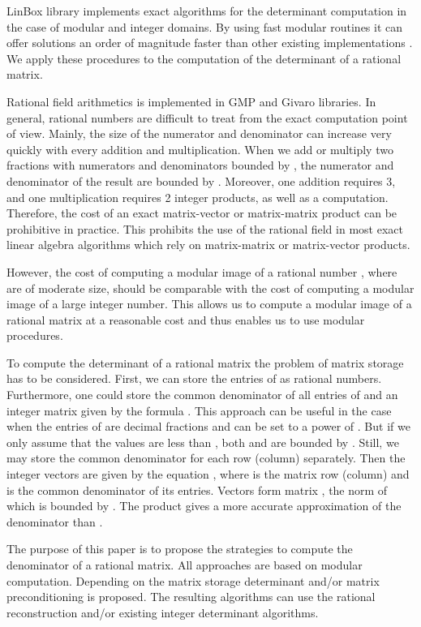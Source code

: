 \documentclass{acm_proc_article-sp}   \usepackage{graphicx,url}
\begin{document}
LinBox library \cite{Dumas2002Linbox} implements exact algorithms for the determinant computation in the case of modular and integer domains. By using fast modular routines \cite{Dumas2002issac,Dumas2004} it can offer solutions an order of magnitude faster than other existing implementations \cite{jgd:2006:det}. We apply these procedures to the computation of the determinant of a rational matrix.


Rational field arithmetics is implemented in GMP \cite{GMP} and
Givaro \cite{Givaro} libraries. In general, rational numbers are
difficult to treat from the exact computation point of view. Mainly,
the size of the numerator and denominator can increase very quickly
with every addition and multiplication. When we add or multiply two
fractions with numerators and denominators bounded by , the
numerator and denominator of the result are bounded by .
Moreover, one addition requires 3, and one multiplication requires 2
integer products, as well as a  computation. Therefore, the
cost of an exact matrix-vector or matrix-matrix product can be
prohibitive in practice.
This prohibits the use of the rational field  in most exact linear algebra algorithms which rely on matrix-matrix or matrix-vector products.


However, the cost of computing a modular image of a rational number , where  are of moderate size, should be comparable with the cost of computing a modular image of a large integer number. This allows us to compute a modular image of a rational matrix at a reasonable cost and thus enables us to use modular procedures. 

To compute the determinant of a rational matrix
 the problem of matrix
storage has to be considered. First, we can store the entries of 
as rational numbers. Furthermore, one could store the common
denominator  of all entries of  and an integer matrix 
given by the formula . This approach can be
useful in the case when the entries of  are decimal fractions and
 can be set to a power of . But if we only assume that the
values  are less than , both  and
 are bounded by . Still, we may store the common
denominator for each row (column) separately. Then the integer
vectors  are given by the equation
, where  is the matrix row
(column) and  is the common denominator of its entries. Vectors
 form matrix , the norm of which is bounded
by . The product  gives a more accurate
approximation of the denominator  than .

The purpose of this paper is to propose the strategies to compute the
denominator of a rational matrix. All approaches are based on modular
computation. Depending on the matrix storage determinant and/or matrix
preconditioning is proposed. The resulting algorithms can use the
rational reconstruction \cite[Ch.5]{gathen} and/or existing integer determinant algorithms.
\end{document}
